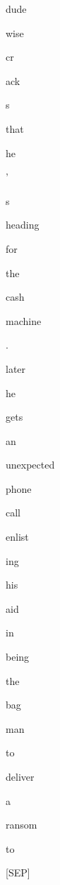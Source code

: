 \documentclass[varwidth=150mm]{standalone}
\begin{document}
\begin{CJK*}{UTF8}{gbsn}
{{{\colorbox{red!4.675008296966553}{\strut dude} \colorbox{red!0.0}{\strut wise}\colorbox{red!0.0}{\strut cr}\colorbox{red!0.0}{\strut ack}\colorbox{red!0.0}{\strut s} \colorbox{red!0.0}{\strut that} \colorbox{red!0.0}{\strut he} \colorbox{red!0.0}{\strut '} \colorbox{red!0.0}{\strut s} \colorbox{red!0.0}{\strut heading} \colorbox{red!0.0}{\strut for} \colorbox{red!0.0}{\strut the} \colorbox{red!0.0}{\strut cash} \colorbox{red!0.0}{\strut machine} \colorbox{red!0.0}{\strut .} \colorbox{red!0.0}{\strut later} \colorbox{red!0.0}{\strut he} \colorbox{red!0.0}{\strut gets} \colorbox{red!1.1407394409179688}{\strut an} \colorbox{red!0.0}{\strut unexpected} \colorbox{red!0.0}{\strut phone} \colorbox{red!0.0}{\strut call} \colorbox{red!0.0}{\strut enlist}\colorbox{red!0.0}{\strut ing} \colorbox{red!0.0}{\strut his} \colorbox{red!0.0}{\strut aid} \colorbox{red!0.0}{\strut in} \colorbox{red!0.0}{\strut being} \colorbox{red!0.0}{\strut the} \colorbox{red!0.0}{\strut bag} \colorbox{red!0.0}{\strut man} \colorbox{red!0.0}{\strut to} \colorbox{red!0.0}{\strut deliver} \colorbox{red!0.0}{\strut a} \colorbox{red!0.0}{\strut ransom} \colorbox{red!6.80362606048584}{\strut to} \colorbox{red!2.8294243812561035}{\strut [SEP]}
}}}
\end{CJK*}
\end{document}
